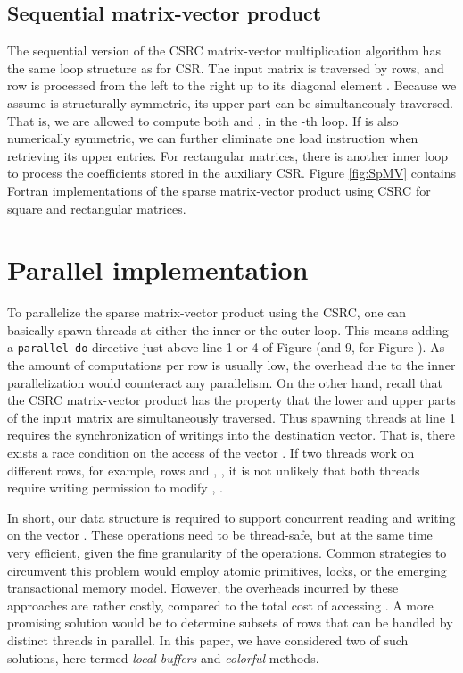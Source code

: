 \documentclass[11pt]{article}
\begin{document}
\subsection{Sequential matrix-vector product}

The sequential version of the CSRC matrix-vector multiplication algorithm has
the same loop structure as for CSR.  The input matrix  is
traversed by rows, and row  is processed from the left to the right up to
its diagonal element .  Because we assume  is structurally
symmetric, its upper part can be simultaneously traversed.  That is, we are
allowed to compute both  and , in the -th loop.  If  is also numerically symmetric, we can further
eliminate one load instruction when retrieving its upper entries.  For
rectangular matrices, there is another inner loop to process the coefficients
stored in the auxiliary CSR.  Figure \ref{fig:SpMV} contains Fortran implementations of
the sparse matrix-vector product using CSRC for square and rectangular matrices.

\section{Parallel implementation}
\label{sec:parallel-csrc}

To parallelize the sparse matrix-vector product using the CSRC, one can basically spawn threads at either the inner or the outer loop.
This means adding a \texttt{parallel do} directive just above line 1 or 4 of Figure  (and 9, for Figure ).
As the amount of computations per row is usually low, the overhead due to the inner parallelization would counteract any parallelism.
On the other hand, recall that the CSRC matrix-vector product has the property that
the lower and upper parts of the input matrix are simultaneously traversed.
Thus spawning threads at line 1 requires the synchronization of writings into the destination vector.
That is, there exists a race condition on the access of the vector .
If two threads work on different rows,
for example, rows  and , , it is not unlikely that both threads
require writing permission to modify , .

In short, our data structure is required to support concurrent reading and
writing on the vector .  These operations need to be thread-safe, but at
the same time very efficient, given the fine granularity of the operations.
Common strategies to circumvent this problem would employ atomic primitives,
locks, or the emerging transactional memory model.  However, the overheads incurred by
these approaches are rather costly, compared to the total cost of accessing
.  A more promising solution would be to determine subsets of rows
that can be handled by distinct threads in parallel.  In this paper, we have
considered two of such solutions, here termed \textit{local buffers} and
\textit{colorful} methods.
\end{document}
